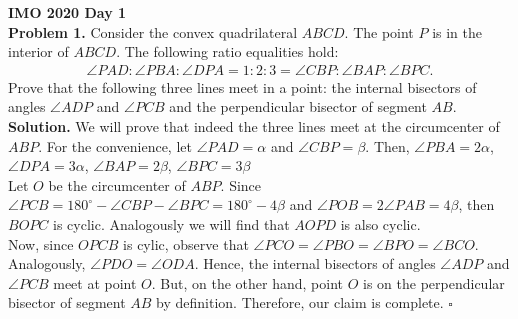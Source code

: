 \documentclass[14pt]{extarticle}
\begin{document}
   \textbf{IMO 2020 Day 1}\\
   
   \textbf{Problem 1. }Consider the convex quadrilateral $ABCD$. The point $P$ is in the interior of $ABCD$. The following ratio equalities hold:
		\begin{align*}
			\angle PAD : \angle PBA : \angle DPA = 1:2:3 = \angle CBP : \angle BAP :\angle BPC.
		\end{align*}
	Prove that the following three lines meet in a point: the internal bisectors of angles $\angle ADP$ and $\angle PCB$ and the perpendicular bisector of segment $AB$.\\
	
	\textbf{Solution.} We will prove that indeed the three lines meet at the circumcenter of $ABP$.
	For the convenience, let $\angle PAD = \alpha$ and $\angle CBP = \beta$.  Then, $\angle PBA= 2\alpha$,  $\angle DPA = 3\alpha$,  $\angle BAP = 2\beta$,  $\angle BPC = 3\beta$ \\
	
	Let  $O$ be the circumcenter of $ABP$. Since $\angle PCB = 180^\circ - \angle CBP - \angle BPC = 180^\circ - 4\beta$  and  $\angle POB = 2\angle PAB = 4\beta$,  then $BOPC$ is cyclic. Analogously we will find that $AOPD$ is also cyclic. \\
	
	Now, since $OPCB$ is cylic, observe that $\angle PCO = \angle PBO = \angle BPO = \angle BCO$. Analogously, $\angle PDO = \angle ODA$. Hence, the internal bisectors of angles $\angle ADP$ and $\angle PCB$ meet at point $O$. But, on the other hand, point $O$ is on the perpendicular bisector of segment $AB$ by definition. Therefore, our claim is complete. $\square$
	
\end{document}
